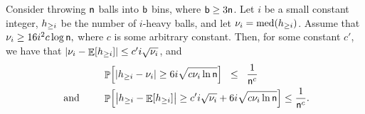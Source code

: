 \begin{lemma}
    Consider throwing $\mathsf{n}$ balls into $\mathsf{b}$ bins, where
    $\mathsf{b} \geq 3 \mathsf{n}$. Let $i$ be a small constant integer,
    $h_{\geq i}$ be the number of $i$-heavy balls, and let
    $\medianC_i = \medX{\NHX{i}}$.  Assume that
    \begin{math}
        \nu_i \geq 16i^2 c \log \mathsf{n},
    \end{math}
    where $c$ is some arbitrary constant.  Then, for some constant
    $c'$, we have that
    $\left| {\nu_i - \mathop{\mathbb{E}}\!\left[ {h_{\geq i}} \right]} \right| \leq c' i \sqrt{\nu_i}$,
    and
    \begin{align*}
        &\Prob{ \cardin{\NHX{i} - \medianC_i } \geq 6i \sqrt{c
              \medianC_i \ln \nballs}}%
        \LEQ %
        \frac{1}{\nballs^{c}}%
        \\
        \text{ and }\qquad
        &%
        \Prob{ \cardin{\bigl.\NHX{i}
              - \Ex{\NHX{i}} } \geq c'i \sqrt{\medianC_i} + 6i \sqrt{c
              \medianC_i \ln \nballs}} \leq %
        \frac{1}{\nballs^{c}}.
  \end{align*}
\end{lemma}
